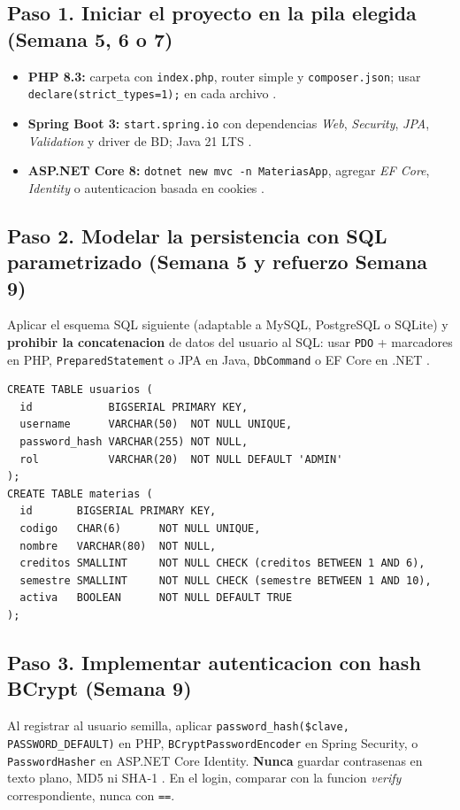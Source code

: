 \documentclass[10pt,a4paper]{article}
\begin{document}
\subsection*{Paso 1. Iniciar el proyecto en la pila elegida (Semana 5, 6 o 7)}
\begin{itemize}[leftmargin=1.4em,itemsep=1pt,topsep=2pt]
    \item \textbf{PHP 8.3:} carpeta con \texttt{index.php}, router simple y \texttt{composer.json}; usar \texttt{declare(strict\_types=1);} en cada archivo \cite{nixon2021learning}.
    \item \textbf{Spring Boot 3:} \texttt{start.spring.io} con dependencias \emph{Web}, \emph{Security}, \emph{JPA}, \emph{Validation} y driver de BD; Java 21 LTS \cite{walls2022spring}.
    \item \textbf{ASP.NET Core 8:} \texttt{dotnet new mvc -n MateriasApp}, agregar \emph{EF Core}, \emph{Identity} o autenticacion basada en cookies \cite{lock2021asp}.
\end{itemize}

\subsection*{Paso 2. Modelar la persistencia con SQL parametrizado (Semana 5 y refuerzo Semana 9)}
Aplicar el esquema SQL siguiente (adaptable a MySQL, PostgreSQL o SQLite) y \textbf{prohibir la concatenacion} de datos del usuario al SQL: usar \texttt{PDO} + marcadores en PHP, \texttt{PreparedStatement} o JPA en Java, \texttt{DbCommand} o EF Core en .NET \cite{owasp2021top10}.

\begin{lstlisting}[style=shellestilo]
CREATE TABLE usuarios (
  id            BIGSERIAL PRIMARY KEY,
  username      VARCHAR(50)  NOT NULL UNIQUE,
  password_hash VARCHAR(255) NOT NULL,
  rol           VARCHAR(20)  NOT NULL DEFAULT 'ADMIN'
);
CREATE TABLE materias (
  id       BIGSERIAL PRIMARY KEY,
  codigo   CHAR(6)      NOT NULL UNIQUE,
  nombre   VARCHAR(80)  NOT NULL,
  creditos SMALLINT     NOT NULL CHECK (creditos BETWEEN 1 AND 6),
  semestre SMALLINT     NOT NULL CHECK (semestre BETWEEN 1 AND 10),
  activa   BOOLEAN      NOT NULL DEFAULT TRUE
);
\end{lstlisting}

\subsection*{Paso 3. Implementar autenticacion con hash BCrypt (Semana 9)}
Al registrar al usuario semilla, aplicar \texttt{password\_hash(\$clave, PASSWORD\_DEFAULT)} en PHP, \texttt{BCryptPasswordEncoder} en Spring Security, o \texttt{PasswordHasher} en ASP.NET Core Identity. \textbf{Nunca} guardar contrasenas en texto plano, MD5 ni SHA-1 \cite{ortega2022securecoding}. En el login, comparar con la funcion \emph{verify} correspondiente, nunca con \texttt{==}.
\end{document}
